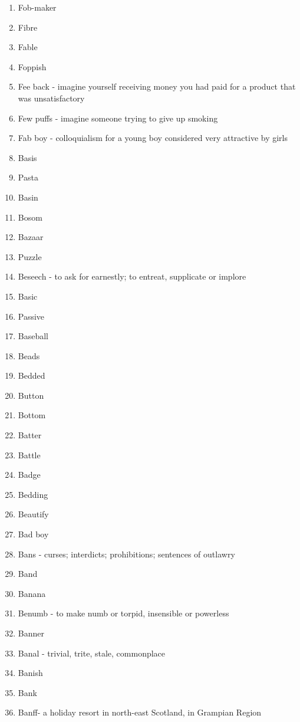\begin{enumerate}
        \item Fob-maker
        \item Fibre
        \item Fable
        \item Foppish
        \item Fee back - imagine yourself receiving money you had paid for a product that was unsatisfactory
        \item Few puffs - imagine someone trying to give up smoking
        \item Fab boy - colloquialism for a young boy considered very attractive by girls
        \item Basis
        \item Pasta
        \item Basin
        \item Bosom
        \item Bazaar
        \item Puzzle
        \item Beseech - to ask for earnestly; to entreat, supplicate or implore
        \item Basic
        \item Passive
        \item Baseball
        \item Beads
        \item Bedded
        \item Button
        \item Bottom
        \item Batter
        \item Battle
        \item Badge
        \item Bedding
        \item Beautify
        \item Bad boy
        \item Bans - curses; interdicts; prohibitions; sentences of outlawry
        \item Band
        \item Banana
        \item Benumb - to make numb or torpid, insensible or powerless
        \item Banner
        \item Banal - trivial, trite, stale, commonplace
        \item Banish
        \item Bank
        \item Banff- a holiday resort in north-east Scotland, in Grampian Region

\end{enumerate}
